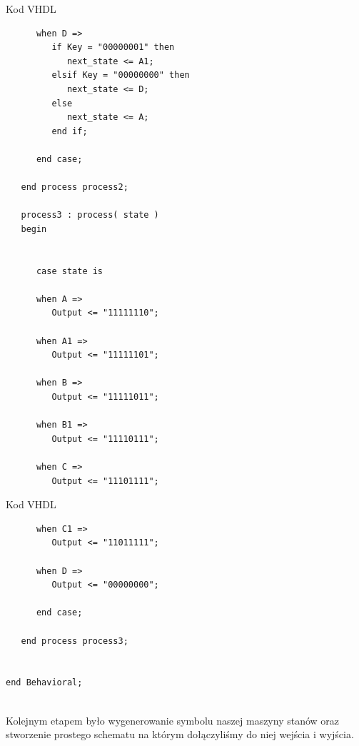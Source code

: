 \documentclass[12pt,a4paper,titlepage]{article}
\begin{document}
\newpage
\begin{listing}[H]
\caption{Kod VHDL}
\begin{verbatim}       
      when D =>
         if Key = "00000001" then
            next_state <= A1;
         elsif Key = "00000000" then
            next_state <= D;
         else
            next_state <= A;
         end if;

      end case;

   end process process2;

   process3 : process( state )
   begin
      
      
      case state is
      
      when A =>
         Output <= "11111110"; 
         
      when A1 =>
         Output <= "11111101"; 
      
      when B =>
         Output <= "11111011";
         
      when B1 =>
         Output <= "11110111";
         
      when C =>
         Output <= "11101111";
          \end{verbatim}
\end{listing}
\newpage
\begin{listing}[H]
\caption{Kod VHDL}
\begin{verbatim}        
      when C1 =>
         Output <= "11011111";
         
      when D =>
         Output <= "00000000";

      end case;

   end process process3;


end Behavioral;


\end{verbatim}
\end{listing}

Kolejnym etapem było wygenerowanie symbolu naszej maszyny stanów oraz stworzenie prostego schematu na którym dołączyliśmy do niej wejścia i wyjścia.
\end{document}
